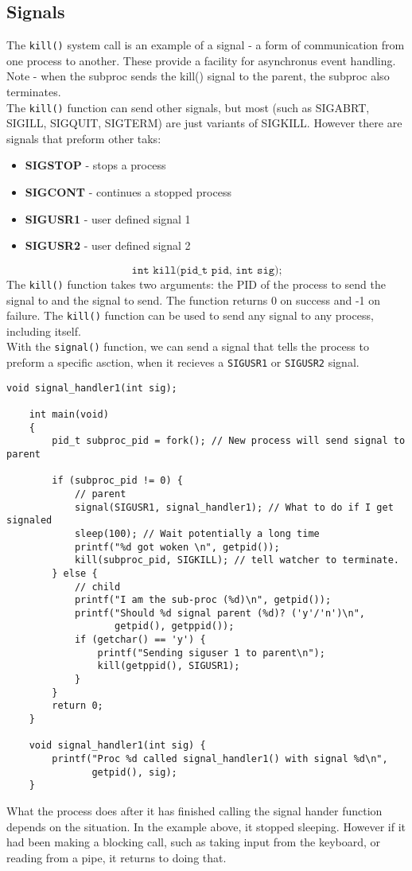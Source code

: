 \documentclass[a4paper, 10pt]{article}
\begin{document}
\subsection{Signals}
The \texttt{kill()} system call is an example of a signal - a form of communication from one process to another. These provide a facility for asynchronus event handling. Note - when the subproc sends the kill() signal to the parent, the subproc also terminates. \\
The \texttt{kill()} function can send other signals, but most (such as SIGABRT, SIGILL, SIGQUIT, SIGTERM) are just variants of SIGKILL. However there are signals that preform other taks:
\begin{itemize}
    \item \textbf{SIGSTOP} - stops a process
    \item \textbf{SIGCONT} - continues a stopped process
    \item \textbf{SIGUSR1} - user defined signal 1
    \item \textbf{SIGUSR2} - user defined signal 2
\end{itemize}
$$\texttt{int kill(pid\_t pid, int sig);}$$
The \texttt{kill()} function takes two arguments: the PID of the process to send the signal to and the signal to send. The function returns 0 on success and -1 on failure. The \texttt{kill()} function can be used to send any signal to any process, including itself. \\
With the \texttt{signal()} function, we can send a signal that tells the process to preform a specific asction, when it recieves a \texttt{SIGUSR1} or \texttt{SIGUSR2} signal.
\begin{lstlisting}[style=cStyle, caption={Signal handling}]
    void signal_handler1(int sig);

    int main(void)
    {
        pid_t subproc_pid = fork(); // New process will send signal to parent
        
        if (subproc_pid != 0) {
            // parent
            signal(SIGUSR1, signal_handler1); // What to do if I get signaled
            sleep(100); // Wait potentially a long time
            printf("%d got woken \n", getpid());
            kill(subproc_pid, SIGKILL); // tell watcher to terminate.
        } else {
            // child
            printf("I am the sub-proc (%d)\n", getpid());
            printf("Should %d signal parent (%d)? ('y'/'n')\n",
                   getpid(), getppid());
            if (getchar() == 'y') {
                printf("Sending siguser 1 to parent\n");
                kill(getppid(), SIGUSR1);
            }
        }
        return 0;
    }

    void signal_handler1(int sig) {
        printf("Proc %d called signal_handler1() with signal %d\n",
               getpid(), sig);
    }
\end{lstlisting}
What the process does after it has finished calling the signal hander function depends on the situation. In the example above, it stopped sleeping. However if it had been making a blocking call, such as taking input from the keyboard, or reading from a pipe, it returns to doing that.
\end{document}
